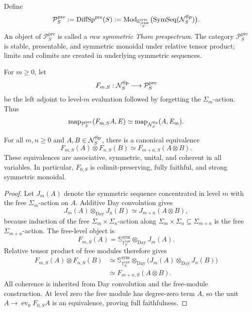 \begin{definition}
\label{def:infinitesimal-raw-prespectra}
Define
\[
    \mathcal P_S^{\mathrm{pre}}
    :=
    \operatorname{DiffSp}^{\mathrm{pre}}(S)
    :=
    \operatorname{Mod}_{\mathbb S_{\mathbb T_S^{\mathrm{raw}}}^{\mathrm{sym}}}
    \bigl(\operatorname{SymSeq}(\mathcal N_S^{\mathrm{Sp}})\bigr).
\]
An object of $\mathcal P_S^{\mathrm{pre}}$ is called a \emph{raw symmetric Thom
prespectrum}.  The category $\mathcal P_S^{\mathrm{pre}}$ is stable,
presentable, and symmetric monoidal under relative tensor product; limits and
colimits are created in underlying symmetric sequences.
\end{definition}

\begin{definition}
\label{def:infinitesimal-free-levels}
For $m\geq0$, let
\[
    F_{m,S}:\mathcal N_S^{\mathrm{Sp}}\longrightarrow\mathcal P_S^{\mathrm{pre}}
\]
be the left adjoint to level-$m$ evaluation followed by forgetting the
$\Sigma_m$-action.  Thus
\[
    \operatorname{map}_{\mathcal P_S^{\mathrm{pre}}}(F_{m,S}A,E)
    \simeq
    \operatorname{map}_{\mathcal N_S^{\mathrm{Sp}}}(A,E_m).
\]
\end{definition}

\begin{proposition}
\label{prop:infinitesimal-free-level-tensor}
For all $m,n\geq0$ and $A,B\in\mathcal N_S^{\mathrm{Sp}}$, there is a canonical equivalence
\[
    \boxed{
    F_{m,S}(A)\otimes F_{n,S}(B)
    \simeq
    F_{m+n,S}(A\otimes B).
    }
\]
These equivalences are associative, symmetric, unital, and coherent in all
variables.  In particular, $F_{0,S}$ is colimit-preserving, fully faithful,
and strong symmetric monoidal.
\end{proposition}

\begin{proof}
Let $J_m(A)$ denote the symmetric sequence concentrated in level $m$ with the
free $\Sigma_m$-action on $A$.  Additive Day convolution gives
\[
    J_m(A)\otimes_{\mathrm{Day}}J_n(B)
    \simeq
    J_{m+n}(A\otimes B),
\]
because induction of the free $\Sigma_m\times\Sigma_n$-action along
$\Sigma_m\times\Sigma_n\subseteq\Sigma_{m+n}$ is the free
$\Sigma_{m+n}$-action.  The free-level object is
\[
    F_{m,S}(A)
    =
    \mathbb S_{\mathbb T_S^{\mathrm{raw}}}^{\mathrm{sym}}
    \otimes_{\mathrm{Day}}J_m(A).
\]
Relative tensor product of free modules therefore gives
\[
\begin{aligned}
    F_{m,S}(A)\otimes F_{n,S}(B)
    &\simeq
    \mathbb S_{\mathbb T_S^{\mathrm{raw}}}^{\mathrm{sym}}
    \otimes_{\mathrm{Day}}
    \bigl(J_m(A)\otimes_{\mathrm{Day}}J_n(B)\bigr)\\
    &\simeq
    F_{m+n,S}(A\otimes B).
\end{aligned}
\]
All coherence is inherited from Day convolution and the free-module
construction.  At level zero the free module has degree-zero term $A$, so the
unit $A\to\operatorname{ev}_0F_{0,S}A$ is an equivalence, proving full
faithfulness.
\end{proof}

